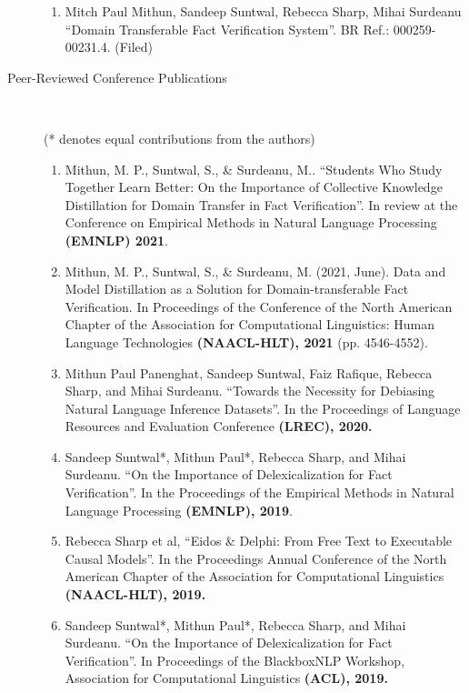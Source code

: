 \documentclass[10pt]{article}
\newcommand{\ti}[1]{``#1''} %
\begin{document}
\begin{description}
\begin{enumerate}
\item 
Mitch Paul Mithun, Sandeep Suntwal, Rebecca Sharp, Mihai Surdeanu \ti{Domain Transferable Fact Verification System}.  BR Ref.: 000259-00231.4. (Filed)\\

\end{enumerate}
\item [ Peer-Reviewed Conference Publications]\


(* denotes equal contributions from the authors)

\begin{enumerate}

\item Mithun, M. P., Suntwal, S., \& Surdeanu, M..   \ti{Students Who Study Together Learn Better: On the Importance of Collective Knowledge Distillation for Domain Transfer in Fact Verification}. In review at  the Conference on Empirical Methods in Natural Language Processing \textbf{(EMNLP) 2021}.


\item Mithun, M. P., Suntwal, S., \& Surdeanu, M. (2021, June). Data and Model Distillation as a Solution for Domain-transferable Fact Verification. In Proceedings of the Conference of the North American Chapter of the Association for Computational Linguistics: Human Language Technologies \textbf{(NAACL-HLT), 2021} (pp. 4546-4552).

\item Mithun Paul Panenghat, Sandeep Suntwal, Faiz Rafique, Rebecca Sharp, and Mihai Surdeanu.   \ti{Towards the Necessity for Debiasing Natural Language Inference Datasets}.  In the Proceedings of Language Resources and Evaluation Conference \textbf{(LREC), 2020.}


\item Sandeep Suntwal*, Mithun Paul*, Rebecca Sharp, and Mihai Surdeanu.   \ti{On the Importance of Delexicalization for Fact Verification}. In the Proceedings of the Empirical Methods in Natural Language Processing \textbf{(EMNLP), 2019}.

\item  Rebecca Sharp et al,   \ti{Eidos \& Delphi: From Free Text to Executable Causal Models}. In the Proceedings Annual Conference of the North American Chapter of the Association for Computational Linguistics \textbf{(NAACL-HLT), 2019.}


\item Sandeep Suntwal*, Mithun Paul*, Rebecca Sharp, and Mihai Surdeanu.   \ti{On the Importance of Delexicalization for Fact Verification}. In Proceedings of the BlackboxNLP Workshop, Association for Computational Linguistics \textbf{(ACL), 2019.}


\end{enumerate}
\end{description}
\end{document}
